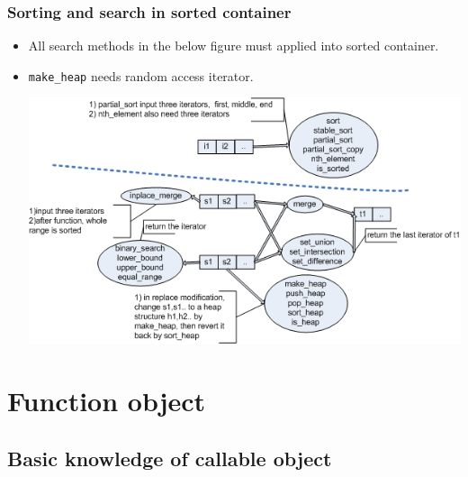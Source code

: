 \documentclass[a4paper,11pt,twoside]{book}
\begin{document}
\begin{itemize}
\end{itemize}
	
\subsubsection{Sorting and search in sorted container}
\begin{itemize}
	\item All search methods in the below figure must applied into sorted container.
	\item \texttt{make\_heap} needs random access iterator.
	
	\begin{center}
	\includegraphics[width=1.0\linewidth]{pics/std4.png}
	\end{center}

\end{itemize}

\section{Function object}
\subsection{Basic knowledge of callable object}
\end{document}
